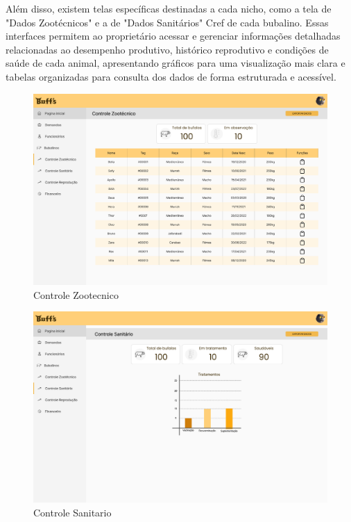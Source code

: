 Além disso, existem telas específicas destinadas a cada nicho, como a tela de "Dados Zootécnicos"  e a de "Dados Sanitários"  Cref de cada bubalino. Essas interfaces permitem ao proprietário acessar e gerenciar informações detalhadas relacionadas ao desempenho produtivo, histórico reprodutivo e condições de saúde de cada animal, apresentando gráficos para uma visualização mais clara e tabelas organizadas para consulta dos dados de forma estruturada e acessível.

\begin{figure}[!h]
\centering
\caption{Controle Zootecnico}%
\label{fig:ux-pc05}
\includegraphics[scale=0.28]{Illustrations/UX-PC/Pc-05.png}
\end{figure}

\newpage
\begin{figure}[!h]
\centering
\caption{Controle Sanitario}%
\label{fig:ux-pc06}
\includegraphics[scale=0.3]{Illustrations/UX-PC/Pc-06.png}
\end{figure}

